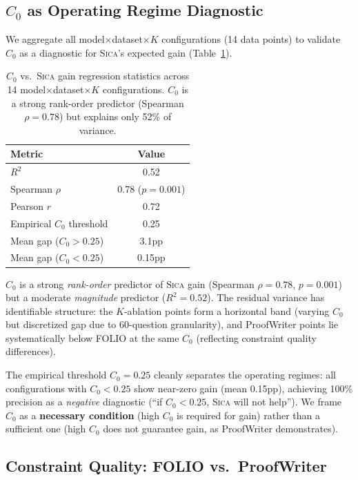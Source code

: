\documentclass[11pt,a4paper]{article}
\newcommand{\sica}{\textsc{Sica}}
\begin{document}
\subsection{$C_0$ as Operating Regime Diagnostic}
\label{sec:c0_analysis}

We aggregate all model$\times$dataset$\times$$K$ configurations (14 data points) to validate $C_0$ as a diagnostic for \sica{}'s expected gain (Table~\ref{tab:c0_stats}).

\begin{table}[t]
\centering
\small
\begin{tabular}{lc}
\toprule
\textbf{Metric} & \textbf{Value} \\
\midrule
$R^2$ & 0.52 \\
Spearman $\rho$ & 0.78 ($p = 0.001$) \\
Pearson $r$ & 0.72 \\
Empirical $C_0$ threshold & 0.25 \\
Mean gap ($C_0 > 0.25$) & 3.1pp \\
Mean gap ($C_0 < 0.25$) & 0.15pp \\
\bottomrule
\end{tabular}
\caption{$C_0$ vs.\ \sica{} gain regression statistics across 14 model$\times$dataset$\times$$K$ configurations. $C_0$ is a strong rank-order predictor (Spearman $\rho{=}0.78$) but explains only 52\% of variance.}
\label{tab:c0_stats}
\end{table}

$C_0$ is a strong \emph{rank-order} predictor of \sica{} gain (Spearman $\rho = 0.78$, $p = 0.001$) but a moderate \emph{magnitude} predictor ($R^2 = 0.52$).
The residual variance has identifiable structure: the $K$-ablation points form a horizontal band (varying $C_0$ but discretized gap due to 60-question granularity), and ProofWriter points lie systematically below FOLIO at the same $C_0$ (reflecting constraint quality differences).

The empirical threshold $C_0 = 0.25$ cleanly separates the operating regimes: all configurations with $C_0 < 0.25$ show near-zero gain (mean 0.15pp), achieving 100\% precision as a \emph{negative} diagnostic (``if $C_0 < 0.25$, \sica{} will not help'').
We frame $C_0$ as a \textbf{necessary condition} (high $C_0$ is required for gain) rather than a sufficient one (high $C_0$ does not guarantee gain, as ProofWriter demonstrates).

\subsection{Constraint Quality: FOLIO vs.\ ProofWriter}
\label{sec:constraint_quality}
\end{document}
